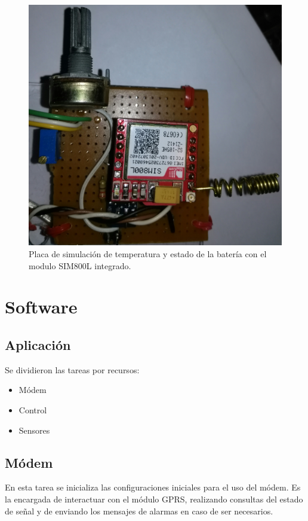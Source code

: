 \begin{figure}[!ht]
  \centering
  \includegraphics[scale=.03]{./Figures/placa_basica.jpg}
  \caption{Placa de simulación de temperatura y estado de la batería con el modulo SIM800L integrado.}
  \label{fig:placa_básicafirst}
\end{figure}


\section{Software}
\subsection{Aplicación}
Se dividieron las tareas por recursos:
\begin{itemize}
  \item Módem 
  \item Control
  \item Sensores
\end{itemize}

\subsection*{Módem}
En esta tarea se inicializa las configuraciones iniciales para el uso del módem. Es la encargada de interactuar con el módulo GPRS, realizando consultas del estado de señal y de enviando los mensajes de alarmas en caso de ser necesarios.

